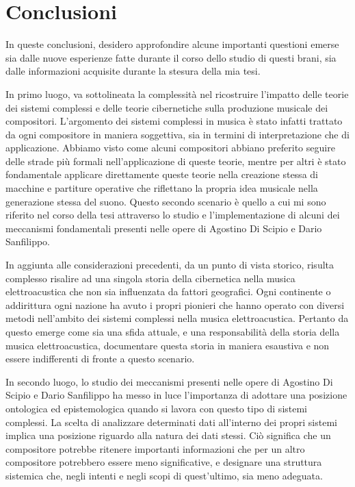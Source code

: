 

\section{Conclusioni}
\label{Conclusioni}

In queste conclusioni, desidero approfondire alcune importanti questioni 
emerse sia dalle nuove esperienze fatte durante il corso dello studio di questi brani, 
sia dalle informazioni acquisite durante la stesura della mia tesi.

In primo luogo, va sottolineata la complessità nel ricostruire 
l'impatto delle teorie dei sistemi complessi e delle teorie cibernetiche 
sulla produzione musicale dei compositori. 
L'argomento dei sistemi complessi in musica è stato infatti trattato da ogni 
compositore in maniera soggettiva, 
sia in termini di interpretazione che di applicazione. 
Abbiamo visto come alcuni compositori abbiano preferito seguire delle strade più formali 
nell'applicazione di queste teorie, 
mentre per altri è stato fondamentale applicare direttamente queste 
teorie nella creazione stessa di macchine e partiture operative che riflettano 
la propria idea musicale nella generazione stessa del suono.
Questo secondo scenario è quello a cui mi sono riferito 
nel corso della tesi attraverso lo studio e l'implementazione
di alcuni dei meccanismi fondamentali presenti nelle
opere di Agostino Di Scipio e Dario Sanfilippo.

In aggiunta alle considerazioni precedenti, da un punto di vista storico, 
risulta complesso risalire ad una singola storia della cibernetica nella musica elettroacustica 
che non sia influenzata da fattori geografici. 
Ogni continente o addirittura ogni nazione ha avuto i propri pionieri 
che hanno operato con diversi metodi nell'ambito dei sistemi complessi nella musica elettroacustica. 
Pertanto da questo emerge come sia una sfida attuale, e una responsabilità della storia della musica elettroacustica, 
documentare questa storia in maniera esaustiva e non essere indifferenti di fronte a questo scenario.

In secondo luogo, lo studio dei meccanismi presenti nelle opere di Agostino Di Scipio e Dario Sanfilippo 
ha messo in luce l'importanza di adottare una posizione ontologica ed epistemologica 
quando si lavora con questo tipo di sistemi complessi. 
La scelta di analizzare determinati dati all'interno dei propri sistemi 
implica una posizione riguardo alla natura dei dati stessi. 
Ciò significa che un compositore potrebbe ritenere importanti informazioni che 
per un altro compositore potrebbero essere meno significative, 
e designare una struttura sistemica che, 
negli intenti e negli scopi di quest'ultimo, sia meno adeguata. 

